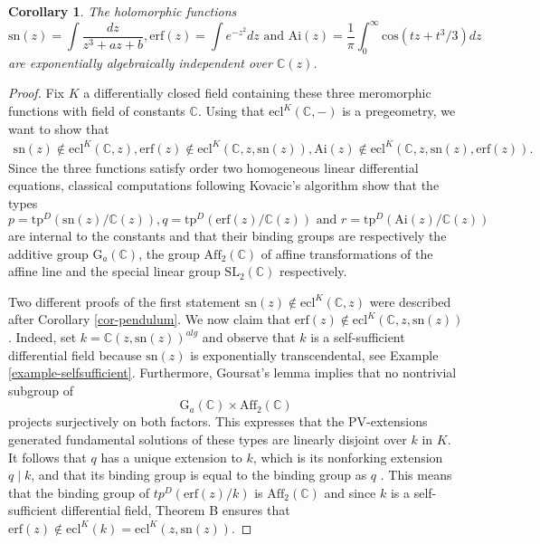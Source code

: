 \documentclass[12pt]{amsart}
\theoremstyle{definition}
\theoremstyle{plain}
\newtheorem{cor}[defn]{Corollary}
\theoremstyle{exampstyle}\newtheorem{thmx}{Theorem}
\theoremstyle{exampstyle}\newtheorem{thmxbis}{Theorem}
\newcommand{\Ga}{\mathrm{G}_a}
\begin{document}
\begin{cor}\label{cor-elliptic-error-Airy}
The holomorphic functions
$$\mathrm{sn}(z) = \int \frac{dz}{z^3 + az + b},  \mathrm{erf}(z) = \int e^{-z^2} dz \text{ and } \mathrm{Ai}(z) = \frac 1 \pi \int_0^\infty \mathrm{cos}(tz + t^3/3) dz $$
are {\em exponentially algebraically independent} over $\mathbb{C}(z)$.
\end{cor} 

\begin{proof} 
Fix $K$ a differentially closed field containing these three meromorphic functions with field of constants $\mathbb{C}$. Using that $\mathrm{ecl}^K(\mathbb{C},-)$ is a pregeometry, we want to show that 
\begin{eqnarray*}
\mathrm{sn}(z)  \notin \mathrm{ecl}^K(\mathbb{C},z), \mathrm{erf}(z) \notin \mathrm{ecl}^K(\mathbb{C},z, \mathrm{sn}(z)), \mathrm{Ai}(z) \notin  \mathrm{ecl}^K(\mathbb{C},z, \mathrm{sn}(z), \mathrm{erf}(z)).
\end{eqnarray*}
Since the three functions satisfy order two homogeneous linear differential equations, classical computations following Kovacic's algorithm \cite{Kovacic} show that the types $$p = \mathrm{tp}^D(\mathrm{sn}(z)/\mathbb{C}(z)), q = \mathrm{tp}^D(\mathrm{erf}(z)/\mathbb{C}(z)) \text{ and } r = \mathrm{tp}^D(\mathrm{Ai}(z)/\mathbb{C}(z)) $$
are internal to the constants and that their binding groups are respectively the additive group $\Ga(\mathbb{C})$, the group $\mathrm{Aff}_2(\mathbb{C})$ of affine transformations of the affine line and the special linear group $\mathrm{SL}_2(\mathbb{C})$ respectively. 

Two different proofs of the first statement $\mathrm{sn}(z)  \notin \mathrm{ecl}^K(\mathbb{C},z)$ were described after Corollary \ref{cor-pendulum}. We now claim that $\mathrm{erf}(z) \notin \mathrm{ecl}^K(\mathbb{C},z, \mathrm{sn}(z))$. Indeed, set $k = \mathbb{C}(z,\mathrm{sn}(z))^{alg}$ and observe that $k$ is a self-sufficient differential field because $\mathrm{sn}(z)$ is exponentially transcendental, see Example \ref{example-selfsufficient}. Furthermore, Goursat's lemma implies that no nontrivial subgroup of $$\Ga(\mathbb{C}) \times \mathrm{Aff}_2(\mathbb{C})$$
projects surjectively on both factors. This expresses that the $\mathrm{PV}$-extensions generated fundamental solutions of these types are linearly disjoint over $k$ in $K$. It follows that $q$ has a unique extension to $k$, which is its nonforking extension $q \mid k$, and that its binding group is equal to the binding group as $q$ . This means that the binding group of $tp^{D}(\mathrm{erf}(z)/k)$ is $\mathrm{Aff}_2(\mathbb{C})$ and since $k$ is a self-sufficient differential field, Theorem B ensures that $\mathrm{erf}(z) \notin \mathrm{ecl}^K(k) = \mathrm{ecl}^{K}(z,\mathrm{sn}(z))$. 


\end{proof}
\end{document}
